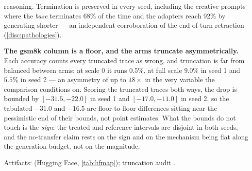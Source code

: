 \begin{table}[tbp]
\begin{threeparttable}
\begin{tablenotes}[flushleft]
reasoning. Termination is preserved in every seed, including the creative prompts
where the \emph{base} terminates 68\% of the time and the adapters reach 92\% by
generating shorter --- an independent corroboration of the end-of-turn retraction
(\cref{disc:pathologies}).
\item \textbf{The gsm8k column is a floor, and the arms truncate asymmetrically.}
Each accuracy counts every truncated trace as wrong, and truncation is far from
balanced between arms: at scale $0$ it runs $0.5\%$, at full scale $9.0\%$ in seed 1
and $5.5\%$ in seed 2 --- an asymmetry of up to $18\times$ in the very variable the
comparison conditions on. Scoring the truncated traces both ways, the drop is bounded
by $[-31.5, -22.0]$ in seed 1 and $[-17.0, -11.0]$ in seed 2, so the tabulated
$-31.0$ and $-16.5$ are floor-to-floor differences sitting near the pessimistic end
of their bounds, not point estimates. What the bounds do not touch is the
\emph{sign}: the treated and reference intervals are disjoint in both seeds, and the
no-transfer claim rests on the sign and on the mechanism being flat along the
generation budget, not on the magnitude.
\item Artifacts: 
(Hugging Face, \cref{tab:hfmap}); truncation audit
.
\end{tablenotes}
\end{threeparttable}
\end{table}

